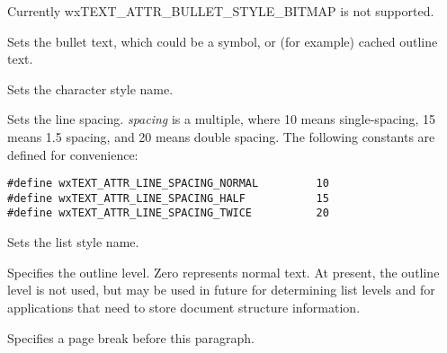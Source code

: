 Currently wxTEXT\_ATTR\_BULLET\_STYLE\_BITMAP is not supported.

\label{wxtextattrexsetbullettext}


Sets the bullet text, which could be a symbol, or (for example) cached outline text.

\label{wxtextattrexsetcharacterstylename}


Sets the character style name.

\label{wxtextattrexsetlinespacing}


Sets the line spacing. {\it spacing} is a multiple, where 10 means single-spacing,
15 means 1.5 spacing, and 20 means double spacing. The following constants are
defined for convenience:

{\small
\begin{verbatim}
#define wxTEXT_ATTR_LINE_SPACING_NORMAL         10
#define wxTEXT_ATTR_LINE_SPACING_HALF           15
#define wxTEXT_ATTR_LINE_SPACING_TWICE          20
\end{verbatim}
}

\label{wxtextattrexsetliststylename}


Sets the list style name.

\label{wxtextattrexsetoutlinelevel}


Specifies the outline level. Zero represents normal text. At present, the outline level is
not used, but may be used in future for determining list levels and for applications
that need to store document structure information.

\label{wxtextattrexsetpagebreak}


Specifies a page break before this paragraph.

